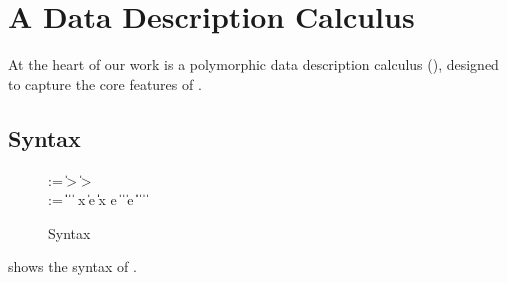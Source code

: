 \section{A Data Description Calculus}
\label{sec:ddc}

At the heart of our work is a polymorphic data description calculus (\ddc{}),
designed to capture the core features of \padsml.

\subsection{\ddc{} Syntax}
\begin{figure}
{\small
\begin{bnf}
   \meta{\gk} \::= \kty \| \ity \-> \gk 
                               \| \kty \-> \gk \\
   \meta{\ty} \::= 
    \ptrue\| \pfalse \|  \| 
    \plam{\var}{\ity}{\ty} \|  \nlalt
    \psig x \ty \ty \| \psum \ty e \ty \| \pand \ty \ty \|
    \pset x \ty e \| \pseq \ty {} \nlalt
    \ptyvar       \| \pmu{\ptyvar}{\gk}{\ty} \| \pcompute e \ity \| 
     \pabsorb \ty \| \pscan{\ty} 
    \nlalt \ptylam{\ptyvar}{\kty}{\ty} \| \ptyapp{\ty}{\ty}
    \nlalt \ptry{\tau} \|  \| 
\end{bnf}
}
\caption{\ddc{} Syntax}
\label{fig:ddc-syntax}
\end{figure}
 shows the syntax of \ddc{}. 

